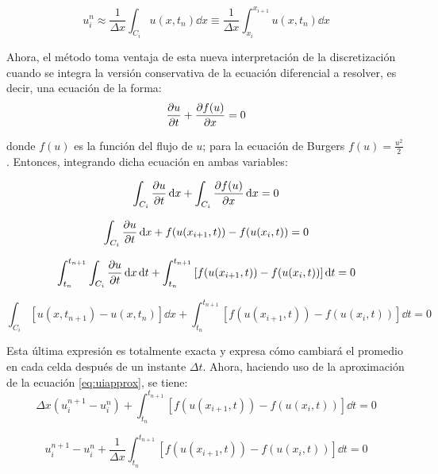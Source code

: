 \documentclass[12pt]{article}
\begin{document}
	\begin{equation}
		u_{i}^{n} \approx \frac{1}{\Delta x} \int_{C_i} u(x,t_n) \dd{x} \equiv \frac{1}{\Delta x} \int_{x_i}^{x_{i+1}} u(x,t_n) \dd{x}
		\label{eq:uiapprox}
	\end{equation}
	
	Ahora, el método toma ventaja de esta nueva interpretación de la discretización cuando se integra la versión conservativa de la ecuación diferencial a resolver, es decir, una ecuación de la forma:
	\begin{equation}
		\pdv{u}{t} + \pdv{f(u)}{x} = 0
	\end{equation}
	
	donde $f(u)$ es la función del flujo de $u$; para la ecuación de Burgers $f(u) = \frac{u^2}{2}$. Entonces, integrando dicha ecuación en ambas variables:
	
	\begin{equation}
		\int_{C_i} \pdv{u}{t} \dd{x} + \int_{C_i} \pdv{f(u)}{x} \dd{x} = 0
		\label{eq:ecuacion-integrada}
	\end{equation}

	\begin{equation}
		\int_{C_i} \pdv{u}{t} \dd{x} + f(u(x_{i+1} ,t)) - f(u(x_{i},t)) = 0
	\end{equation}

	\begin{equation}
		\int_{t_n}^{t_{n+1}} \int_{C_i} \pdv{u}{t} \dd{x} \dd{t} + \int_{t_n}^{t_{n+1}}\left[ f(u(x_{i+1} ,t)) - f(u(x_{i},t))\right]\dd{t} = 0
	\end{equation}

	\begin{equation}
		\int_{C_i} \left[u(x, t_{n+1}) - u(x, t_n)\right] \dd{x} + \int_{t_n}^{t_{n+1}}\left[ f(u(x_{i+1} ,t)) - f(u(x_{i},t))\right]\dd{t} = 0 
	\end{equation}
	
	Esta última expresión es totalmente exacta y expresa cómo cambiará el promedio en cada celda después de un instante $\Delta t$. Ahora, haciendo uso de la aproximación de la ecuación \ref{eq:uiapprox}, se tiene:
	\begin{equation}
		 \Delta x\left( u_{i}^{n+1} - u_{i}^{n}\right)   + \int_{t_n}^{t_{n+1}}\left[ f(u(x_{i+1} ,t)) - f(u(x_{i},t))\right]\dd{t} = 0 
	\end{equation}

	\begin{equation}
		u_{i}^{n+1} - u_{i}^{n} + \frac{1}{\Delta x}\int_{t_n}^{t_{n+1}}\left[ f(u(x_{i+1} ,t)) - f(u(x_{i},t))\right]\dd{t} = 0 
	\end{equation}
\end{document}
